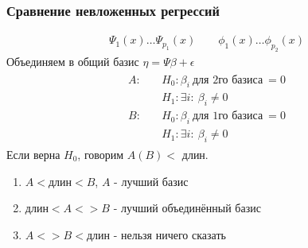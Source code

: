 \documentclass{article}
\begin{document}
\subsubsection{Сравнение невложенных регрессий}
\begin{gather*}
  \Psi_1(x)\dots \Psi_{p_1}(x) \qquad \phi_1(x)\dots \phi_{p_2}(x)
\end{gather*}
Объединяем в общий базис $\eta=\Psi \beta + \epsilon$
\begin{gather*}
  \begin{aligned}
    A: \quad  & H_0: \beta_i \ \text{для 2го базиса} \ = 0 \\ 
    & H_1: \exists i : \: \beta_i \neq 0 \\
    B: \quad  & H_0: \beta_i \ \text{для 1го базиса} \ = 0 \\ 
    & H_1: \exists i : \: \beta_i \neq 0
  \end{aligned}
\end{gather*}
Если верна $H_0$, говорим $A (B) < $ длин.
\begin{enumerate}
  \item $A < \text{длин} < B$, $A$ - лучший базис
  \item $\text{длин} < A <> B$ - лучший объединённый базис
  \item $A <> B < \text{длин} $ - нельзя ничего сказать
\end{enumerate}
\end{document}
